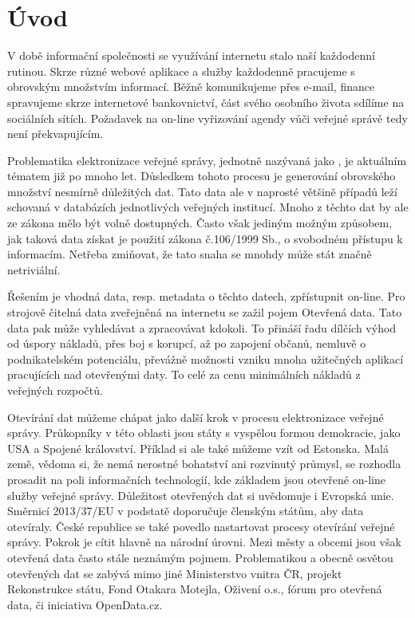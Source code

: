 \chapter{Úvod}

V době informační společnosti se využívání internetu stalo naší každodenní rutinou. Skrze různé webové aplikace a služby každodenně pracujeme s obrovským množstvím informací. Běžně komunikujeme přes e-mail, finance spravujeme skrze internetové bankovnictví, část svého osobního života sdílíme na sociálních sítích. Požadavek na on-line vyřizování agendy vůči veřejné správě tedy není překvapujícím.

Problematika elektronizace veřejné správy, jednotně nazývaná jako , je aktuálním tématem již po mnoho let. Důsledkem tohoto procesu je generování obrovského množství nesmírně důležitých dat. Tato data ale v naprosté většině případů leží schovaná v databázích jednotlivých veřejných institucí. Mnoho z těchto dat by ale ze zákona mělo být volně dostupných. Často však jediným možným způsobem, jak taková data získat je použití zákona č.106/1999 Sb.\cite{z106}, o svobodném přístupu k informacím. Netřeba zmiňovat, že tato snaha se mnohdy může stát značně netriviální.

Řešením je vhodná data, resp. metadata o těchto datech, zpřístupnit on-line. Pro strojově čitelná data zveřejněná na internetu se zažil pojem Otevřená data. Tato data pak může vyhledávat a zpracovávat kdokoli. To přináší řadu dílčích výhod od úspory nákladů, přes boj s korupcí, až po zapojení občanů, nemluvě o podnikatelském potenciálu, převážně možnosti vzniku mnoha užitečných aplikací pracujících nad otevřenými daty. To celé za cenu minimálních nákladů z veřejných rozpočtů.

Otevírání dat můžeme chápat jako další krok v procesu elektronizace veřejné správy. Průkopníky v této oblasti jsou státy s vyspělou formou demokracie, jako USA a Spojené království. Příklad si ale také můžeme vzít od Estonska. Malá země, vědoma si, že nemá nerostné bohatství ani rozvinutý průmysl, se rozhodla prosadit na poli informačních technologií, kde základem jsou otevřené on-line služby veřejné správy. Důležitost otevřených dat si uvědomuje i Evropská unie. Směrnicí 2013/37/EU\cite{smeu} v podstatě doporučuje členským státům, aby data otevíraly. 
České republice se také povedlo nastartovat procesy otevírání veřejné správy. Pokrok je cítit hlavně na národní úrovni. Mezi městy a obcemi jsou však otevřená data často stále neznámým pojmem. Problematikou a obecně osvětou otevřených dat se zabývá mimo jiné Ministerstvo vnitra ČR\cite{mv}, projekt Rekonstrukce státu\cite{rek}, Fond Otakara Motejla\cite{fom}, Oživení o.s.\cite{oz}, fórum pro otevřená data\cite{otevrenadata}, či iniciativa OpenData.cz\cite{od}.

